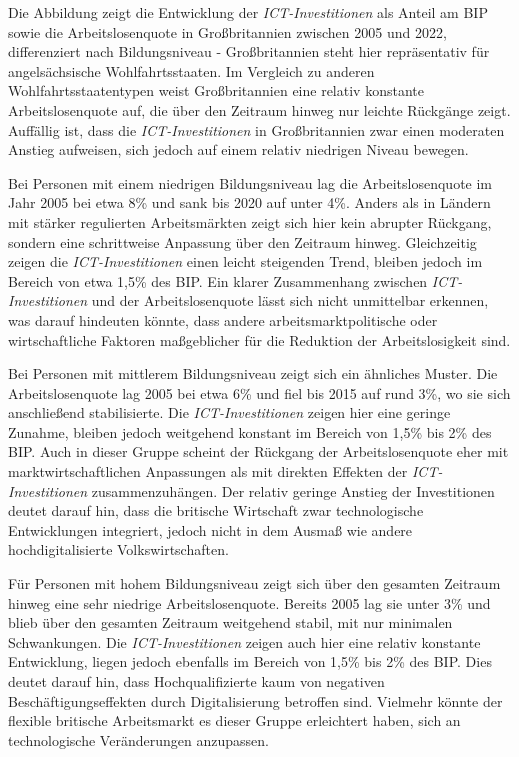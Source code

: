 Die Abbildung zeigt die Entwicklung der \textit{\ac{ICT}-Investitionen} als Anteil am BIP 
sowie die Arbeitslosenquote in Großbritannien zwischen 2005 und 2022, differenziert nach 
Bildungsniveau - Großbritannien steht hier repräsentativ für angelsächsische 
Wohlfahrtsstaaten. Im Vergleich zu anderen Wohlfahrtsstaatentypen weist Großbritannien eine 
relativ konstante Arbeitslosenquote auf, die über den Zeitraum hinweg nur leichte 
Rückgänge zeigt. Auffällig ist, dass die \textit{\ac{ICT}-Investitionen} in Großbritannien 
zwar einen moderaten Anstieg aufweisen, sich jedoch auf einem relativ niedrigen Niveau 
bewegen.

Bei Personen mit einem niedrigen Bildungsniveau lag die Arbeitslosenquote im Jahr 2005 
bei etwa 8\% und sank bis 2020 auf unter 4\%. Anders als in Ländern mit stärker 
regulierten Arbeitsmärkten zeigt sich hier kein abrupter Rückgang, sondern eine 
schrittweise Anpassung über den Zeitraum hinweg. Gleichzeitig zeigen die 
\textit{\ac{ICT}-Investitionen} einen leicht steigenden Trend, bleiben jedoch im Bereich 
von etwa 1,5\% des BIP. Ein klarer Zusammenhang zwischen \textit{\ac{ICT}-Investitionen} 
und der Arbeitslosenquote lässt sich nicht unmittelbar erkennen, was darauf hindeuten 
könnte, dass andere arbeitsmarktpolitische oder wirtschaftliche Faktoren maßgeblicher für 
die Reduktion der Arbeitslosigkeit sind.

Bei Personen mit mittlerem Bildungsniveau zeigt sich ein ähnliches Muster. Die 
Arbeitslosenquote lag 2005 bei etwa 6\% und fiel bis 2015 auf rund 3\%, wo sie sich 
anschließend stabilisierte. Die \textit{\ac{ICT}-Investitionen} zeigen hier eine geringe 
Zunahme, bleiben jedoch weitgehend konstant im Bereich von 1,5\% bis 2\% des BIP. Auch in 
dieser Gruppe scheint der Rückgang der Arbeitslosenquote eher mit marktwirtschaftlichen 
Anpassungen als mit direkten Effekten der \textit{\ac{ICT}-Investitionen} zusammenzuhängen. 
Der relativ geringe Anstieg der Investitionen deutet darauf hin, dass die britische 
Wirtschaft zwar technologische Entwicklungen integriert, jedoch nicht in dem Ausmaß wie 
andere hochdigitalisierte Volkswirtschaften.

Für Personen mit hohem Bildungsniveau zeigt sich über den gesamten Zeitraum hinweg eine 
sehr niedrige Arbeitslosenquote. Bereits 2005 lag sie unter 3\% und blieb über den 
gesamten Zeitraum weitgehend stabil, mit nur minimalen Schwankungen. Die 
\textit{\ac{ICT}-Investitionen} zeigen auch hier eine relativ konstante Entwicklung, 
liegen jedoch ebenfalls im Bereich von 1,5\% bis 2\% des BIP. Dies deutet darauf hin, 
dass Hochqualifizierte kaum von negativen Beschäftigungseffekten durch Digitalisierung 
betroffen sind. Vielmehr könnte der flexible britische Arbeitsmarkt es dieser Gruppe 
erleichtert haben, sich an technologische Veränderungen anzupassen.


